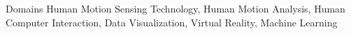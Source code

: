 

\begin{cvskills}

  \cvskill
    {Domains} %
    {Human Motion Sensing Technology, Human Motion Analysis, Human Computer Interaction, Data Visualization, Virtual Reality, Machine Learning } %

\end{cvskills}